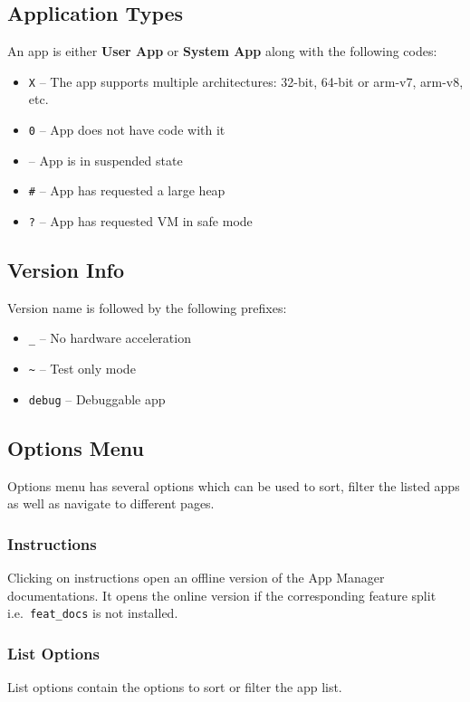 \subsection{Application Types}\label{subsec:main-page-application-types}
An app is either \textbf{User App} or \textbf{System App} along with the following codes:
\begin{itemize}
    \item \texttt{X} -- The app supports multiple architectures: 32-bit, 64-bit or arm-v7, arm-v8, etc.
    \item \texttt{0} -- App does not have code with it
    \item \texttt{\textdegree} -- App is in suspended state
    \item \texttt{\#} -- App has requested a large heap
    \item \texttt{?} -- App has requested VM in safe mode
\end{itemize}

\subsection{Version Info}\label{subsec:main-page-version-info}
Version name is followed by the following prefixes:
\begin{itemize}
    \item \texttt{\_} -- No hardware acceleration
    \item \texttt{\textasciitilde} -- Test only mode
    \item \texttt{debug} -- Debuggable app
\end{itemize}

\subsection{Options Menu}\label{subsec:main-page-options-menu}
Options menu has several options which can be used to sort, filter the listed apps as well as navigate to different pages.

\subsubsection{Instructions}
Clicking on instructions open an offline version of the App Manager documentations. It opens the online version if the
corresponding feature split i.e.\ \texttt{feat\_docs} is not installed.

\subsubsection{List Options}\label{subsubsec:main-list-options}
List options contain the options to sort or filter the app list.


